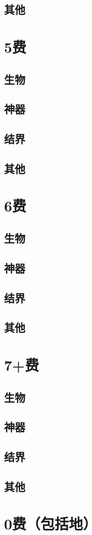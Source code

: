 \documentclass[lang = cn, color = black, 10pt]{AllThatStax}
\begin{document}
\section{其他}

\chapter{5费}

\section{生物}

\section{神器}

\section{结界}

\section{其他}

\chapter{6费}

\section{生物}

\section{神器}

\section{结界}

\section{其他}

\chapter{7+费}

\section{生物}

\section{神器}

\section{结界}

\section{其他}

\chapter{0费（包括地）}
\end{document}
